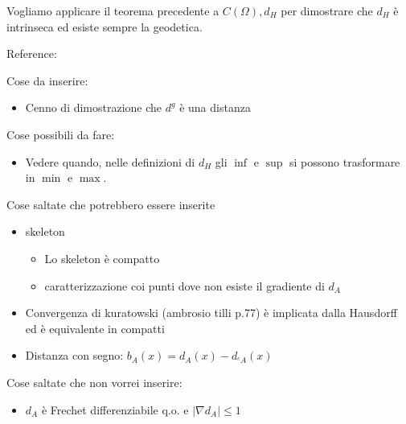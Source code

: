 \documentclass[a4paper,10pt]{article}
\theoremstyle{plain}
\theoremstyle{definition}
\theoremstyle{remark}
\newcommand{\abs}[1]{\left|#1\right|}
\begin{document}
Vogliamo applicare il teorema precedente a $C(\Omega),d_H$ per
dimostrare che $d_H$ è intrinseca ed esiste sempre la geodetica.

Reference: \cite[p.12-14]{DuciMennucci2007}


\newpage





\newpage

Cose da inserire:
\begin{itemize}
\item Cenno di dimostrazione che $d^g$ è una distanza
\end{itemize}

Cose possibili da fare:

\begin{itemize}
\item Vedere quando, nelle definizioni di $d_H$ gli $\inf$ e $\sup$ si
  possono trasformare in $\min$ e $\max$.
\end{itemize}


Cose saltate che potrebbero essere inserite
\begin{itemize}
\item skeleton
  \begin{itemize}
  \item Lo skeleton è compatto
  \item caratterizzazione coi punti dove non esiste il gradiente di
    $d_A$
  \end{itemize}
\item Convergenza di kuratowski (ambrosio tilli p.77) è implicata
  dalla Hausdorff ed è equivalente in compatti
\item Distanza con segno: $b_A(x) = d_A(x) - d_{^cA}(x)$
\end{itemize}


Cose saltate che non vorrei inserire:
\begin{itemize}
\item $d_A$ è Frechet differenziabile q.o. e $\abs{\nabla d_A} \le 1$
\end{itemize}
\end{document}
